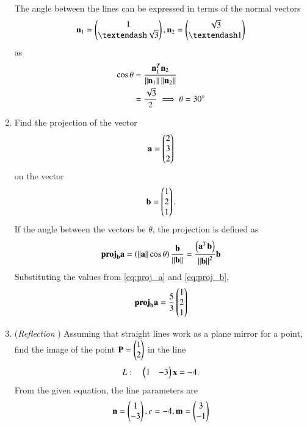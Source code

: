 \begin{enumerate}[label=\thesubsection.\arabic*.,ref=\thesubsection.\theenumi]
The angle between the lines can be expressed in terms of the normal vectors 
\begin{align}
\vec{n}_1 = \myvec{1 \\ – \sqrt{3}},  
\vec{n}_2 =\myvec{\sqrt{3} \\ –1}
\end{align}
as
%
\begin{align}
\label{eq:vec_angle}
\cos \theta &= \frac{\mathbf{n}_1^T\mathbf{n}_2}{\left\lVert\mathbf{n}_1\right\rVert\left\lVert\mathbf{n}_2\right\rVert}
\\
&= \frac{\sqrt{3}}{2} \implies \theta = 30\degree
\end{align}
\item Find the projection of the vector 
\begin{align}
\label{eq:proj_a}
\mathbf{a} = \begin{pmatrix}2\\3\\2\end{pmatrix}
\end{align}
on the vector
\begin{align}
\label{eq:proj_b}
\mathbf{b}=\begin{pmatrix}1\\2\\1\end{pmatrix}.
\end{align}
\solution 
%
If the angle between the vectors be $\theta$, the projection is defined as 
\begin{align}
\textbf{proj}_{\mathbf{b}}\mathbf{a} = 
\left(\left\lVert\mathbf{a}\right\rVert\cos\theta\right) \frac{\mathbf{b}}{\left\lVert\mathbf{b}\right\rVert}
=  \frac{\left(\mathbf{a}^T\mathbf{b}\right)}{\left\lVert\mathbf{b}\right\rVert^2}\mathbf{b}
\end{align}
Substituting the values from \eqref{eq:proj_a}
 and \eqref{eq:proj_b},
\begin{align}
\textbf{proj}_{\mathbf{b}}\mathbf{a} = \frac{5}{3}\begin{pmatrix}1\\2\\1\end{pmatrix}
\end{align}
\item ({\em Reflection }) Assuming that straight lines work as a plane mirror for a point, find the image of the point $\mathbf{P}=\begin{pmatrix}1\\2\end{pmatrix}$ in the line 
%
\begin{align}
L: \quad \begin{pmatrix}1 & -3\end{pmatrix}\mathbf{x}  = -4.
\end{align}
\solution From the given equation, the line parameters are
\begin{align}
\mathbf{n} = \begin{pmatrix}1 \\ -3\end{pmatrix}, c =  -4, \mathbf{m} = \begin{pmatrix}3 \\ -1\end{pmatrix}
\end{align}


\end{enumerate}
